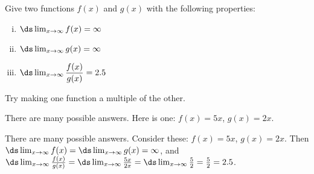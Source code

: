 %
%
\subsection*{\Conceptual}

\begin{Mquestion}\label{s3.7indet1}
Give two functions $f(x)$ and $g(x)$ with the following properties:
\begin{enumerate}[(i)]
\item $\ds\lim_{x \to \infty} f(x)=\infty$
\item $\ds\lim_{x \to \infty} g(x)=\infty$
\item $\ds\lim_{x \to \infty} \dfrac{f(x)}{g(x)}=2.5$
\end{enumerate}
\end{Mquestion}
\begin{hint} Try making one function a multiple of the other.
\end{hint}
\begin{answer} There are many possible answers. Here is one: $f(x)=5x$, $g(x)=2x$.
\end{answer}
\begin{solution} There are many possible answers. Consider these: $f(x)=5x$, $g(x)=2x$.
Then $\ds\lim_{x \rightarrow\infty}f(x)=\ds\lim_{x\to\infty}g(x)=\infty$, and
$\ds\lim_{x\to\infty}\frac{f(x)}{g(x)}=\ds\lim_{x\to\infty}\frac{5x}{2x}=\ds\lim_{x\to\infty}\frac{5}{2}=\frac{5}{2}=2.5$.
\end{solution}


